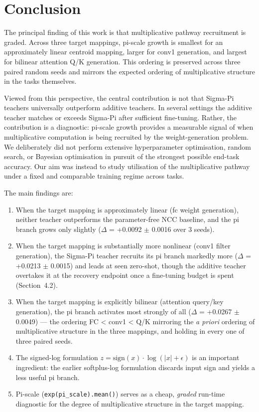 \documentclass{article}
\providecommand{\tightlist}{%
  \setlength{\itemsep}{0pt}\setlength{\parskip}{0pt}}
\begin{document}
\section{Conclusion}\label{conclusion}

The principal finding of this work is that multiplicative pathway recruitment is graded. Across three target mappings, pi-scale growth is smallest for an approximately linear centroid mapping, larger for conv1 generation, and largest for bilinear attention Q/K generation. This ordering is preserved across three paired random seeds and mirrors the expected ordering of multiplicative structure in the tasks themselves.

Viewed from this perspective, the central contribution is not that Sigma-Pi teachers universally outperform additive teachers. In several settings the additive teacher matches or exceeds Sigma-Pi after sufficient fine-tuning. Rather, the contribution is a diagnostic: pi-scale growth provides a measurable signal of when multiplicative computation is being recruited by the weight-generation problem. We deliberately did not perform extensive hyperparameter optimisation, random search, or Bayesian optimisation in pursuit of the strongest possible end-task accuracy. Our aim was instead to study utilisation of the multiplicative pathway under a fixed and comparable training regime across tasks.

The main findings are:

\begin{enumerate}
\def\labelenumi{\arabic{enumi}.}
\tightlist
\item
  When the target mapping is approximately linear (fc weight generation), neither teacher outperforms the parameter-free NCC baseline, and the pi branch grows only slightly ($\Delta$ = +0.0092 $\pm$ 0.0016 over 3 seeds).
\item
  When the target mapping is substantially more nonlinear (conv1 filter generation), the Sigma-Pi teacher recruits its pi branch markedly more ($\Delta$ = +0.0213 $\pm$ 0.0015) and leads at seen zero-shot, though the additive teacher overtakes it at the recovery endpoint once a fine-tuning budget is spent (Section~4.2).
\item
  When the target mapping is explicitly bilinear (attention query/key generation), the pi branch activates most strongly of all ($\Delta$ = +0.0267 $\pm$ 0.0049) --- the ordering FC \textless{} conv1 \textless{} Q/K mirroring the \emph{a priori} ordering of multiplicative structure in the three mappings, and holding in every one of three paired seeds.
\item
  The signed-log formulation $z=\mathrm{sign}(x)\cdot\log(|x|+\epsilon)$ is an important ingredient: the earlier softplus-log formulation discards input sign and yields a less useful pi branch.
\item
  Pi-scale (\texttt{exp(pi\_scale).mean()}) serves as a cheap, \emph{graded} run-time diagnostic for the degree of multiplicative structure in the target mapping.
\end{enumerate}
\end{document}

